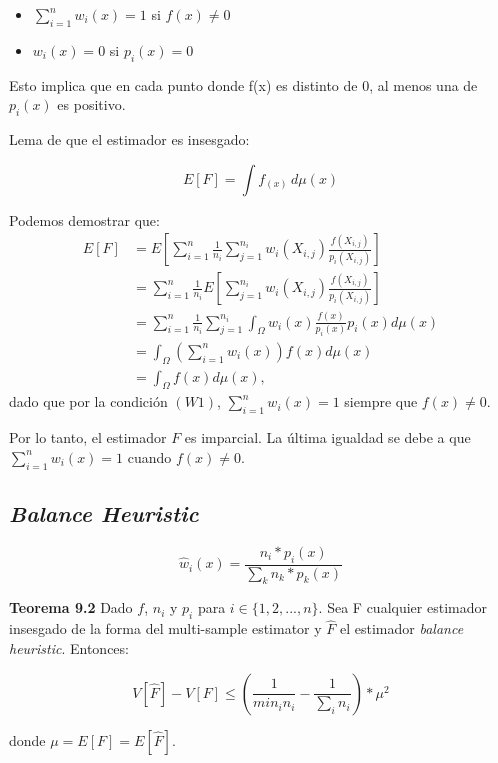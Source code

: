 \documentclass{article}
\begin{document}
\begin{itemize}
    \item $\sum_{i=1}^{n} w_{i}(x) = 1$ si $f(x) \neq 0$
    \item $w_{i}(x) = 0$ si $p_{i}(x) = 0$
\end{itemize}

Esto implica que en cada punto donde f(x) es distinto de 0, al menos una de $p_{i}(x)$ es positivo.

Lema de que el estimador es insesgado:

$$E[F] = \int f_(x) \,d\mu(x)$$

Podemos demostrar que:
\begin{align*}
E[F] &= E\left[\sum_{i=1}^n \frac{1}{n_i} \sum_{j=1}^{n_i} w_i(X_{i,j}) \frac{f(X_{i,j})}{p_i(X_{i,j})}\right] \\
&= \sum_{i=1}^n \frac{1}{n_i} E\left[\sum_{j=1}^{n_i} w_i(X_{i,j}) \frac{f(X_{i,j})}{p_i(X_{i,j})}\right] \\
&= \sum_{i=1}^n \frac{1}{n_i} \sum_{j=1}^{n_i} \int_{\Omega} w_i(x) \frac{f(x)}{p_i(x)} p_i(x) d\mu(x) \\
&= \int_{\Omega} \left(\sum_{i=1}^n w_i(x)\right) f(x) d\mu(x) \\
&= \int_{\Omega} f(x) d\mu(x),
\end{align*}
dado que por la condición \( (W1) \), \( \sum_{i=1}^n w_i(x) = 1 \) siempre que \( f(x) \neq 0 \).

Por lo tanto, el estimador \( F \) es imparcial. La última igualdad se debe a que \( \sum_{i=1}^n w_i(x) = 1 \) cuando \( f(x) \neq 0 \).

\subsection{\textit{Balance Heuristic}}

$$ \hat{w}_{i}(x) = \frac{n_{i} * p_{i}(x)}{\sum_{k} n_{k} * p_{k}(x)}$$

\textbf{Teorema 9.2} Dado $f$, $n_{i}$ y $p_{i}$ para $i \in \{1, 2, ..., n\}$. Sea F cualquier estimador insesgado de la forma del multi-sample estimator y $\hat{F}$ el estimador \textit{balance heuristic}. Entonces:

$$V[\hat{F}] - V[F] \leq ( \frac{1}{min_{i} n_{i}} - \frac{1}{\sum_{i} n_{i}} ) * \mu^{2}$$

donde $\mu = E[F] = E[\hat{F}]$.



\end{document}
